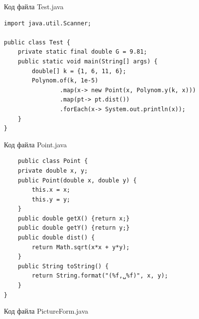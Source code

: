 \documentclass[a4paper, 14pt]{extarticle}
\begin{document}
\par
Код файла Test.java
\begin{lstlisting}
import java.util.Scanner;

public class Test {
    private static final double G = 9.81;
    public static void main(String[] args) {
        double[] k = {1, 6, 11, 6};
        Polynom.of(k, 1e-5)
                .map(x-> new Point(x, Polynom.y(k, x)))
                .map(pt-> pt.dist())
                .forEach(x-> System.out.println(x));
    }
}
\end{lstlisting}
\par
Код файла Point.java
\begin{lstlisting}
    public class Point {
    private double x, y;
    public Point(double x, double y) {
        this.x = x;
        this.y = y;
    }
    public double getX() {return x;}
    public double getY() {return y;}
    public double dist() {
        return Math.sqrt(x*x + y*y);
    }
    public String toString() {
        return String.format("(%f,␣%f)", x, y);
    }
}
\end{lstlisting}
\par
Код файла PictureForm.java
\end{document}
